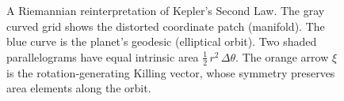 \begin{figure}[H]
\begin{tikzpicture}[>=stealth,scale=1]
    \end{tikzpicture}
    \caption{%
    A Riemannian reinterpretation of Kepler’s Second Law.  
    The gray curved grid shows the distorted coordinate patch (manifold).  
    The blue curve is the planet’s geodesic (elliptical orbit).  
    Two shaded parallelograms have equal intrinsic area \(\tfrac12\,r^2\,\Delta\theta\).  
    The orange arrow \(\xi\) is the rotation‐generating Killing vector, whose symmetry preserves area elements along the orbit.}
\end{figure}
    